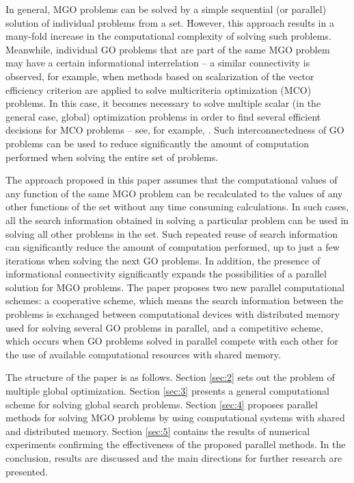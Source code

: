 \documentclass[review]{elsarticle}
\begin{document}
In general, MGO problems can be solved by a simple sequential (or parallel) solution of individual problems from a set. However, this approach results in a many-fold increase in the computational complexity of solving such problems. Meanwhile, individual GO problems that are part of the same MGO problem may have a certain informational interrelation -- a similar connectivity is observed, for example, when methods based on scalarization of the vector efficiency criterion are applied to solve multicriteria optimization (MCO) problems. In this case, it becomes necessary to solve multiple scalar (in the general case, global) optimization problems in order to find several efficient decisions  for MCO problems -- see, for example, \cite{c29,c30,c31,c32,c33}. Such interconnectedness of GO problems can be used to reduce significantly the amount of computation performed when solving the entire set of problems.

The approach proposed in this paper assumes that the computational values of any function of the same MGO problem can be recalculated to the values of any other functions of the set without any time consuming calculations. In such cases, all the search information obtained in solving a particular problem can be used in solving all other problems in the set. Such repeated reuse of search information can significantly reduce the amount of computation performed, up to just a few iterations when solving the next GO problems. In addition, the presence of informational connectivity significantly expands the possibilities of a parallel solution for MGO problems. The paper proposes two new parallel computational schemes: a cooperative scheme, which means the search information between the problems is exchanged between computational devices with distributed memory used for solving several GO problems in parallel, and a competitive scheme, which occurs when GO problems solved in parallel compete with each other for the use of available computational resources with shared memory.

The structure of the paper is as follows. Section \ref{sec:2} sets out the problem of multiple global optimization. Section \ref{sec:3} presents a general computational scheme for solving global search problems. Section \ref{sec:4} proposes parallel methods for solving MGO problems by using computational systems with shared and distributed memory. Section \ref{sec:5} contains the results of numerical experiments confirming the effectiveness of the proposed parallel methods. In the conclusion, results are discussed and the main directions for further research are presented.
\end{document}
